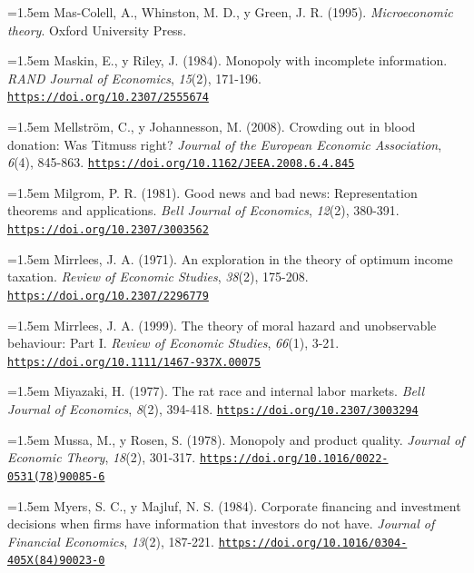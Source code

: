 \documentclass[10pt,a4paper]{article}
\begin{document}
\noindent\hangindent=1.5em Mas-Colell, A., Whinston, M. D., y Green, J. R. (1995). \textit{Microeconomic theory}. Oxford University Press.

\noindent\hangindent=1.5em Maskin, E., y Riley, J. (1984). Monopoly with incomplete information. \textit{RAND Journal of Economics}, \textit{15}(2), 171-196. \href{https://doi.org/10.2307/2555674}{\nolinkurl{https://doi.org/10.2307/2555674}}

\noindent\hangindent=1.5em Mellström, C., y Johannesson, M. (2008). Crowding out in blood donation: Was Titmuss right? \textit{Journal of the European Economic Association}, \textit{6}(4), 845-863. \href{https://doi.org/10.1162/JEEA.2008.6.4.845}{\nolinkurl{https://doi.org/10.1162/JEEA.2008.6.4.845}}

\noindent\hangindent=1.5em Milgrom, P. R. (1981). Good news and bad news: Representation theorems and applications. \textit{Bell Journal of Economics}, \textit{12}(2), 380-391. \href{https://doi.org/10.2307/3003562}{\nolinkurl{https://doi.org/10.2307/3003562}}

\noindent\hangindent=1.5em Mirrlees, J. A. (1971). An exploration in the theory of optimum income taxation. \textit{Review of Economic Studies}, \textit{38}(2), 175-208. \href{https://doi.org/10.2307/2296779}{\nolinkurl{https://doi.org/10.2307/2296779}}

\noindent\hangindent=1.5em Mirrlees, J. A. (1999). The theory of moral hazard and unobservable behaviour: Part I. \textit{Review of Economic Studies}, \textit{66}(1), 3-21. \href{https://doi.org/10.1111/1467-937X.00075}{\nolinkurl{https://doi.org/10.1111/1467-937X.00075}}

\noindent\hangindent=1.5em Miyazaki, H. (1977). The rat race and internal labor markets. \textit{Bell Journal of Economics}, \textit{8}(2), 394-418. \href{https://doi.org/10.2307/3003294}{\nolinkurl{https://doi.org/10.2307/3003294}}

\noindent\hangindent=1.5em Mussa, M., y Rosen, S. (1978). Monopoly and product quality. \textit{Journal of Economic Theory}, \textit{18}(2), 301-317. \href{https://doi.org/10.1016/0022-0531(78)90085-6}{\nolinkurl{https://doi.org/10.1016/0022-0531(78)90085-6}}

\noindent\hangindent=1.5em Myers, S. C., y Majluf, N. S. (1984). Corporate financing and investment decisions when firms have information that investors do not have. \textit{Journal of Financial Economics}, \textit{13}(2), 187-221. \href{https://doi.org/10.1016/0304-405X(84)90023-0}{\nolinkurl{https://doi.org/10.1016/0304-405X(84)90023-0}}
\end{document}
